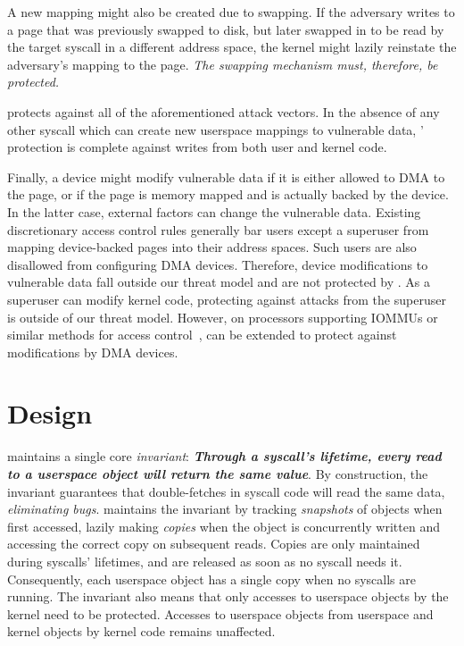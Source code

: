 \documentclass[letterpaper,twocolumn,10pt]{article}
\begin{document}
A new mapping might also be created due to swapping.
If the adversary writes to a page that was previously swapped 
to disk, but later swapped in to be read by the target syscall in 
a different address space, the kernel might lazily reinstate 
the adversary's mapping to the page.
\emph{The swapping mechanism must, therefore, be protected.}

\midas protects against all of the aforementioned attack vectors.
In the absence of any other syscall which can create new userspace 
mappings to vulnerable data, \midas' protection is complete 
against writes from both user and kernel code.

Finally, a device might modify vulnerable data if it is either 
allowed to DMA to the page, or if the page is memory mapped and is 
actually backed by the device.
In the latter case, external factors can change the vulnerable 
data.
Existing discretionary access control rules generally bar users 
except a superuser from mapping device-backed pages into their
address spaces.
Such users are also disallowed from configuring DMA devices.
Therefore, device modifications to vulnerable data fall outside 
our threat model and are not protected by \midas.
As a superuser can modify kernel code, protecting against attacks from the
superuser is outside of our threat model.
However, on processors supporting IOMMUs or similar methods for 
access control~\cite{olsonbordercontrol}, \midas can be extended 
to protect against modifications by DMA devices.


\section{\midas Design} 
\label{sec:design}

\midas maintains a single core \emph{invariant}:
\textbf{\emph{Through a syscall's lifetime, every read to a userspace object 
will return the same value}}.
By construction, the invariant guarantees that double-fetches in syscall
code will read the same data, \emph{eliminating \tocttou bugs}.
\midas maintains the invariant by tracking \emph{snapshots} of objects
when first accessed, lazily making \emph{copies} when the object is concurrently 
written and accessing the correct copy on subsequent reads.
Copies are only maintained during syscalls' lifetimes, and are released as 
soon as no syscall needs it.
Consequently, each userspace object has a single copy when no syscalls are
running.
The invariant also means that only accesses to userspace objects by the kernel
need to be protected. 
Accesses to userspace objects from userspace and kernel objects by kernel 
code remains unaffected.
\end{document}
